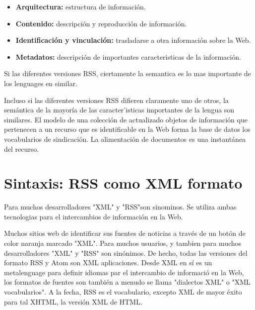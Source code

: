 \begin{itemize}

\item \textbf{Arquitectura:} estructura de informaci\'{o}n.

\item \textbf{Contenido:} descripci\'{o}n y reproducci\'{o}n de informaci\'{o}n.

\item \textbf{Identificaci\'{o}n y vinculaci\'{o}n:} trasladarse a otra informaci\'{o}n sobre la Web.

\item \textbf{Metadatos:} descripci\'{o}n de importantes caracteristicas de la informaci\'{o}n.

\end{itemize}

Si las diferentes versiones RSS, ciertamente la semantica es lo mas importante de los lenguages en similar.

\scriptsize

\begin{flushleft}

Incluso si las diferentes versiones RSS difieren claramente uno de otros, la sem\'{a}ntica de la mayor\'{i}a
de las caracter'{i}sticas importantes de la lengua son similares. El modelo de una colecci\'{o}n de actualizado
objetos de informaci\'{o}n que pertenecen a un recurso que es identificable en la Web forma la base de datos los
vocabularios de sindicaci\'{o}n. La alimentaci\'{o}n de documentos es una instant\'{a}nea del recurso.

\end{flushleft}

\normalsize

\section{Sintaxis: RSS como XML formato}

Para muchos desarrolladores "XML" y "RSS"son sinominos. Se utiliza ambas tecnologias para el intercambios de informaci\'{o}n
en la Web.

\scriptsize

Muchos sitios web de identificar sus fuentes de noticias a trav\'{e}s de un bot\'{o}n de color naranja marcado "XML". Para muchos
usuarios, y tambien para muchos desarrolladores "XML" y "RSS" son sin\'{o}nimos. De hecho, todas las versiones del formato RSS y
Atom son XML aplicaciones. Desde XML en s\'{i} es un metalenguage para definir idiomas par el intercambio de informaci\'{o} en la
Web, los formatos de fuentes son tambi\'{e}n a menudo se llama "dialectos XML" o "XML vocabularios". A la fecha, RSS es el vocabulario, 
excepto XML de mayor \'{e}xito para tal XHTML, la versi\'{o}n XML de HTML.

